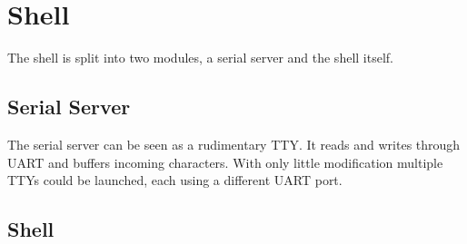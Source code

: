\section{Shell}

The shell is split into two modules, a serial server and the shell itself.

\subsection{Serial Server}
The serial server can be seen as a rudimentary TTY. It reads and writes through UART and buffers incoming characters.
With only little modification multiple TTYs could be launched, each using a different UART port.


\subsection{Shell}

